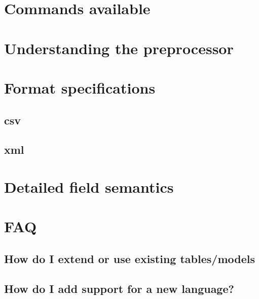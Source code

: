     \section{Commands available}

    \section{Understanding the preprocessor}

    \section{Format specifications}

        \subsection{csv}

        \subsection{xml}

    \section{Detailed field semantics}

    \section{FAQ}
        \subsection{How do I extend or use existing tables/models}

        \subsection{How do I add support for a new language?}

%
%

